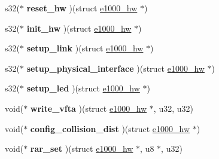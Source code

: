 \begin{DoxyCompactItemize}
\item 
\hypertarget{structe1000__mac__operations_a74715aab502987c6b09ca97983acdb1f}{
s32($\ast$ {\bfseries reset\_\-hw} )(struct \hyperlink{structe1000__hw}{e1000\_\-hw} $\ast$)}
\label{structe1000__mac__operations_a74715aab502987c6b09ca97983acdb1f}

\item 
\hypertarget{structe1000__mac__operations_a99fa3045badb3ab4831077bf6c976cc6}{
s32($\ast$ {\bfseries init\_\-hw} )(struct \hyperlink{structe1000__hw}{e1000\_\-hw} $\ast$)}
\label{structe1000__mac__operations_a99fa3045badb3ab4831077bf6c976cc6}

\item 
\hypertarget{structe1000__mac__operations_aa21cc0eac51a6475a947d5887febcd18}{
s32($\ast$ {\bfseries setup\_\-link} )(struct \hyperlink{structe1000__hw}{e1000\_\-hw} $\ast$)}
\label{structe1000__mac__operations_aa21cc0eac51a6475a947d5887febcd18}

\item 
\hypertarget{structe1000__mac__operations_ad97185810bd7d927d08493332d1991d5}{
s32($\ast$ {\bfseries setup\_\-physical\_\-interface} )(struct \hyperlink{structe1000__hw}{e1000\_\-hw} $\ast$)}
\label{structe1000__mac__operations_ad97185810bd7d927d08493332d1991d5}

\item 
\hypertarget{structe1000__mac__operations_a4a27a9dc27e1dcefe2fd0b73cb466f32}{
s32($\ast$ {\bfseries setup\_\-led} )(struct \hyperlink{structe1000__hw}{e1000\_\-hw} $\ast$)}
\label{structe1000__mac__operations_a4a27a9dc27e1dcefe2fd0b73cb466f32}

\item 
\hypertarget{structe1000__mac__operations_a8f42a4a4be533cfde11163b891c3235d}{
void($\ast$ {\bfseries write\_\-vfta} )(struct \hyperlink{structe1000__hw}{e1000\_\-hw} $\ast$, u32, u32)}
\label{structe1000__mac__operations_a8f42a4a4be533cfde11163b891c3235d}

\item 
\hypertarget{structe1000__mac__operations_a8a896c92ecb913bd0fad6233f6a33a99}{
void($\ast$ {\bfseries config\_\-collision\_\-dist} )(struct \hyperlink{structe1000__hw}{e1000\_\-hw} $\ast$)}
\label{structe1000__mac__operations_a8a896c92ecb913bd0fad6233f6a33a99}

\item 
\hypertarget{structe1000__mac__operations_af93b266fe08a6b8f1b697b2c194ece1c}{
void($\ast$ {\bfseries rar\_\-set} )(struct \hyperlink{structe1000__hw}{e1000\_\-hw} $\ast$, u8 $\ast$, u32)}
\label{structe1000__mac__operations_af93b266fe08a6b8f1b697b2c194ece1c}


\end{DoxyCompactItemize}
